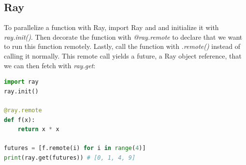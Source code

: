 \subsection{Ray}
To parallelize a function with Ray, import Ray and and initialize it with \textit{ray.init()}. Then decorate the function with \textit{@ray.remote} to declare that we want to run this function remotely. Lastly, call the function with \textit{.remote()} instead of calling it normally. This remote call yields a future, a Ray object reference, that we can then fetch with \textit{ray.get}:

\begin{lstlisting}[language=Python]
import ray
ray.init()

@ray.remote
def f(x):
    return x * x

futures = [f.remote(i) for i in range(4)]
print(ray.get(futures)) # [0, 1, 4, 9]
    \end{lstlisting}

